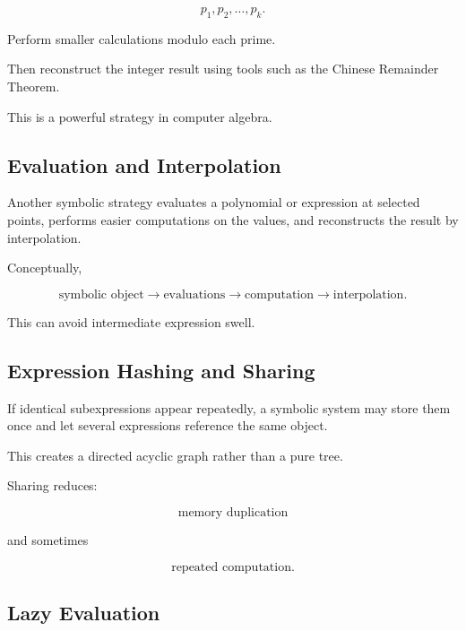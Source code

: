 \[
\boxed{
p_1,
p_2,
\ldots,p_k.
}
\]

Perform smaller calculations modulo each prime.

Then reconstruct the integer result using tools such as the Chinese
Remainder Theorem.

This is a powerful strategy in computer algebra.

\subsection{Evaluation and Interpolation}
\label{subsec:symbolic-evaluation-interpolation}

Another symbolic strategy evaluates a polynomial or expression at selected
points, performs easier computations on the values, and reconstructs the
result by interpolation.

Conceptually,

\[
\boxed{
\text{symbolic object}
\rightarrow
\text{evaluations}
\rightarrow
\text{computation}
\rightarrow
\text{interpolation}.
}
\]

This can avoid intermediate expression swell.

\subsection{Expression Hashing and Sharing}
\label{subsec:expression-sharing}

If identical subexpressions appear repeatedly, a symbolic system may store
them once and let several expressions reference the same object.

This creates a directed acyclic graph rather than a pure tree.

Sharing reduces:

\[
\boxed{
\text{memory duplication}
}
\]

and sometimes

\[
\boxed{
\text{repeated computation}.
}
\]

\subsection{Lazy Evaluation}
\label{subsec:symbolic-lazy-evaluation}

